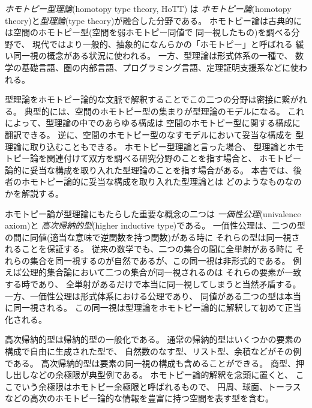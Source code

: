 \documentclass[index]{subfiles}
\begin{document}

\emph{ホモトピー型理論}(homotopy type theory, HoTT) は
\emph{ホモトピー論}(homotopy theory)と\emph{型理論}(type theory)が融合した分野である。
ホモトピー論は古典的には空間のホモトピー型(空間を弱ホモトピー同値で
同一視したもの)を調べる分野で、
現代ではより一般的、抽象的になんらかの「ホモトピー」と呼ばれる
緩い同一視の概念がある状況に使われる。
一方、型理論は形式体系の一種で、
数学の基礎言語、圏の内部言語、プログラミング言語、定理証明支援系などに使われる。

型理論をホモトピー論的な文脈で解釈することでこの二つの分野は密接に繋がれる。
典型的には、空間のホモトピー型の集まりが型理論のモデルになる。
これによって、型理論の中でのあらゆる構成は
空間のホモトピー型に関する構成に翻訳できる。
逆に、空間のホモトピー型のなすモデルにおいて妥当な構成を
型理論に取り込むこともできる。
ホモトピー型理論と言った場合、
型理論とホモトピー論を関連付けて双方を調べる研究分野のことを指す場合と、
ホモトピー論的に妥当な構成を取り入れた型理論のことを指す場合がある。
本書では、後者のホモトピー論的に妥当な構成を取り入れた型理論とは
どのようなものなのかを解説する。

ホモトピー論が型理論にもたらした重要な概念の二つは
\emph{一価性公理}(univalence axiom)と
\emph{高次帰納的型}(higher inductive type)である。
一価性公理は、二つの型の間に同値(適当な意味で逆関数を持つ関数)がある時に
それらの型は同一視されることを保証する。
従来の数学でも、二つの集合の間に全単射がある時に
それらの集合を同一視するのが自然であるが、この同一視は非形式的である。
例えば公理的集合論において二つの集合が同一視されるのは
それらの要素が一致する時であり、
全単射があるだけで本当に同一視してしまうと当然矛盾する。
一方、一価性公理は形式体系における公理であり、
同値がある二つの型は本当に同一視される。
この同一視は型理論をホモトピー論的に解釈して初めて正当化される。

高次帰納的型は帰納的型の一般化である。
通常の帰納的型はいくつかの要素の構成で自由に生成された型で、
自然数のなす型、リスト型、余積などがその例である。
高次帰納的型は要素の同一視の構成も含めることができる。
商型、押し出しなどの余極限が典型例である。
ホモトピー論的解釈を念頭に置くと、
ここでいう余極限はホモトピー余極限と呼ばれるもので、
円周、球面、トーラスなどの高次のホモトピー論的な情報を豊富に持つ空間を表す型を含む。

\begin{mySubsections}
  
\end{mySubsections}
\end{document}
